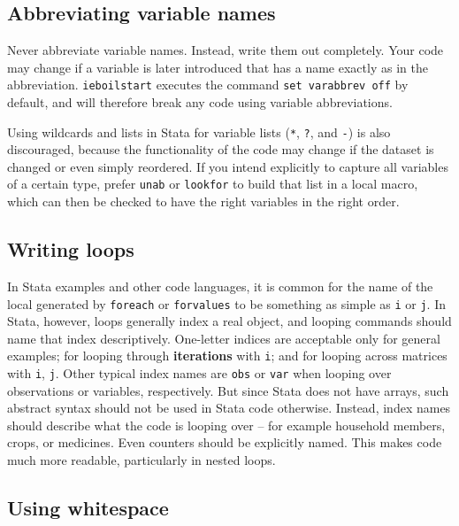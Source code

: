 \subsection{Abbreviating variable names}

Never abbreviate variable names. Instead, write them out completely.
Your code may change if a variable is later introduced
that has a name exactly as in the abbreviation.
\texttt{ieboilstart} executes the command \texttt{set varabbrev off} by default,
and will therefore break any code using variable abbreviations.

Using wildcards and lists in Stata for variable lists
(\texttt{*}, \texttt{?}, and \texttt{-}) is also discouraged,
because the functionality of the code may change
if the dataset is changed or even simply reordered.
If you intend explicitly to capture all variables of a certain type,
prefer \texttt{unab} or \texttt{lookfor} to build that list in a local macro,
which can then be checked to have the right variables in the right order.

\subsection{Writing loops}

In Stata examples and other code languages, it is common for the name of the local generated by \texttt{foreach} or \texttt{forvalues}
to be something as simple as \texttt{i} or \texttt{j}. In Stata, however,
loops generally index a real object, and looping commands should name that index descriptively.
One-letter indices are acceptable only for general examples;
for looping through \textbf{iterations} with \texttt{i};
and for looping across matrices with \texttt{i}, \texttt{j}.
Other typical index names are \texttt{obs} or \texttt{var} when looping over observations or variables, respectively.
But since Stata does not have arrays,
such abstract syntax should not be used in Stata code otherwise.
Instead, index names should describe what the code is looping over --
for example household members, crops, or medicines.
Even counters should be explicitly named.
This makes code much more readable, particularly in nested loops.


\subsection{Using whitespace}

